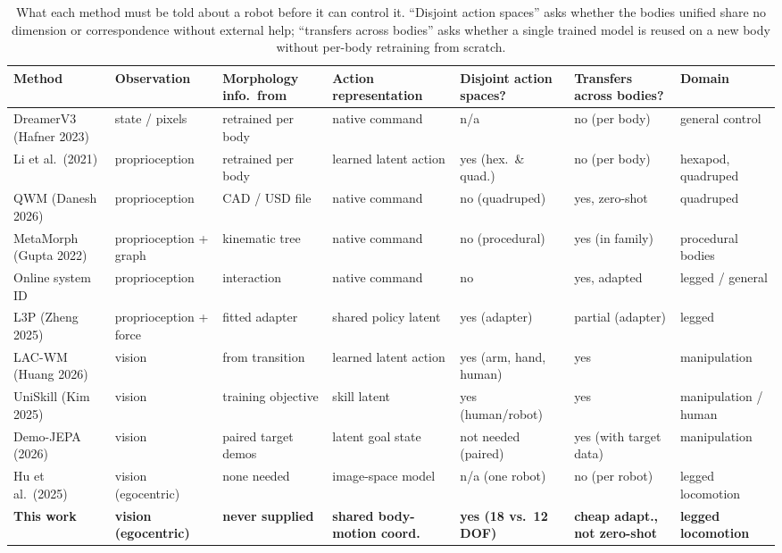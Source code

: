 \documentclass[12pt,a4paper,oneside]{report}
\begin{document}
\begin{table}[H]
\centering
\scriptsize
\setlength{\tabcolsep}{3pt}
\caption{What each method must be told about a robot before it can control it. ``Disjoint action
spaces'' asks whether the bodies unified share no dimension or correspondence without external help;
``transfers across bodies'' asks whether a single trained model is reused on a new body without
per-body retraining from scratch.}
\label{tab:positioning}
\begin{tabularx}{\textwidth}{>{\hsize}Y>{\hsize}Y>{\hsize}Y>{\hsize}Y>{\hsize}Y>{\hsize}Y>{\hsize}Y}
\hline
\textbf{Method} & \textbf{Observation} & \textbf{Morphology info.\ from} & \textbf{Action representation} & \textbf{Disjoint action spaces?} & \textbf{Transfers across bodies?} & \textbf{Domain}\\
\hline
DreamerV3 (Hafner 2023) & state / pixels & retrained per body & native command & n/a & no (per body) & general control\\
Li et al.\ (2021) & proprioception & retrained per body & learned latent action & yes (hex.\ \& quad.) & no (per body) & hexapod, quadruped\\
QWM (Danesh 2026) & proprioception & CAD / USD file & native command & no (quadruped) & yes, zero-shot & quadruped\\
MetaMorph (Gupta 2022) & proprioception + graph & kinematic tree & native command & no (procedural) & yes (in family) & procedural bodies\\
Online system ID & proprioception & interaction & native command & no & yes, adapted & legged / general\\
L3P (Zheng 2025) & proprioception + force & fitted adapter & shared policy latent & yes (adapter) & partial (adapter) & legged\\
LAC-WM (Huang 2026) & vision & from transition & learned latent action & yes (arm, hand, human) & yes & manipulation\\
UniSkill (Kim 2025) & vision & training objective & skill latent & yes (human/robot) & yes & manipulation / human\\
Demo-JEPA (2026) & vision & paired target demos & latent goal state & not needed (paired) & yes (with target data) & manipulation\\
Hu et al.\ (2025) & vision (egocentric) & none needed & image-space model & n/a (one robot) & no (per robot) & legged locomotion\\
\textbf{This work} & \textbf{vision (egocentric)} & \textbf{never supplied} & \textbf{shared body-motion coord.} & \textbf{yes (18 vs.\ 12 DOF)} & \textbf{cheap adapt., not zero-shot} & \textbf{legged locomotion}\\
\hline
\end{tabularx}
\end{table}
\end{document}
